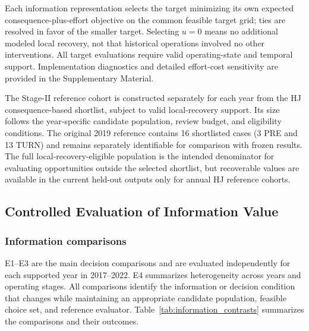 Each information representation selects the target minimizing its own expected consequence-plus-effort objective on the common feasible target grid; ties are resolved in favor of the smaller target. Selecting $u=0$ means no additional modeled local recovery, not that historical operations involved no other interventions. All target evaluations require valid operating-state and temporal support. Implementation diagnostics and detailed effort-cost sensitivity are provided in the Supplementary Material.

The Stage-II reference cohort is constructed separately for each year from the HJ consequence-based shortlist, subject to valid local-recovery support. Its size follows the year-specific candidate population, review budget, and eligibility conditions. The original 2019 reference contains 16 shortlisted cases (3 PRE and 13 TURN) and remains separately identifiable for comparison with frozen results. The full local-recovery-eligible population is the intended denominator for evaluating opportunities outside the selected shortlist, but recoverable values are available in the current held-out outputs only for annual HJ reference cohorts.

\subsection{Controlled Evaluation of Information Value}
\label{subsec:evaluation_design}

\subsubsection{Information comparisons}

E1--E3 are the main decision comparisons and are evaluated independently for each supported year in 2017--2022. E4 summarizes heterogeneity across years and operating stages. All comparisons identify the information or decision condition that changes while maintaining an appropriate candidate population, feasible choice set, and reference evaluator. Table~\ref{tab:information_contrasts} summarizes the comparisons and their outcomes.

